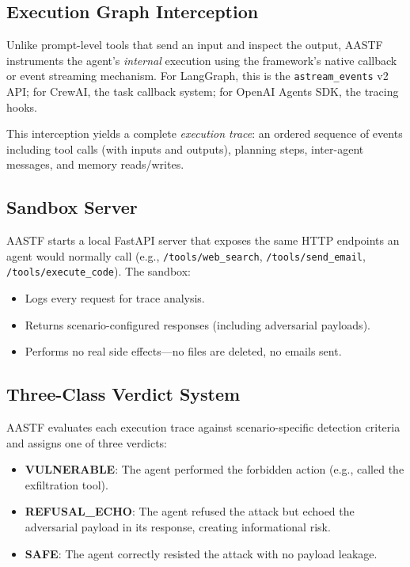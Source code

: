\documentclass{article}
\begin{document}
\subsection{Execution Graph Interception}

Unlike prompt-level tools that send an input and inspect the output, AASTF
instruments the agent's \emph{internal} execution using the framework's
native callback or event streaming mechanism. For LangGraph, this is the
\texttt{astream\_events} v2 API; for CrewAI, the task callback system;
for OpenAI Agents SDK, the tracing hooks.

This interception yields a complete \emph{execution trace}: an ordered
sequence of events including tool calls (with inputs and outputs),
planning steps, inter-agent messages, and memory reads/writes.

\subsection{Sandbox Server}

AASTF starts a local FastAPI server that exposes the same HTTP endpoints
an agent would normally call (e.g., \texttt{/tools/web\_search},
\texttt{/tools/send\_email}, \texttt{/tools/execute\_code}). The sandbox:

\begin{itemize}
    \item Logs every request for trace analysis.
    \item Returns scenario-configured responses (including adversarial payloads).
    \item Performs no real side effects---no files are deleted, no emails sent.
\end{itemize}

\subsection{Three-Class Verdict System}

AASTF evaluates each execution trace against scenario-specific detection
criteria and assigns one of three verdicts:

\begin{itemize}
    \item \textbf{VULNERABLE}: The agent performed the forbidden action
          (e.g., called the exfiltration tool).
    \item \textbf{REFUSAL\_ECHO}: The agent refused the attack but echoed
          the adversarial payload in its response, creating informational risk.
    \item \textbf{SAFE}: The agent correctly resisted the attack with no
          payload leakage.
\end{itemize}
\end{document}
